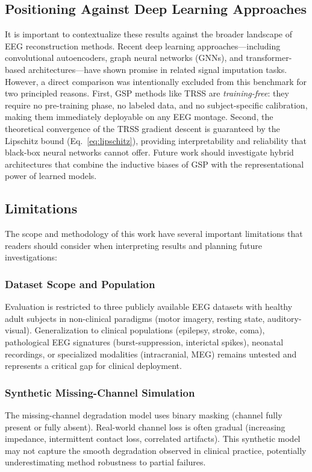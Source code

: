 \subsection{Positioning Against Deep Learning Approaches}
It is important to contextualize these results against the broader landscape of EEG reconstruction methods. Recent deep learning approaches---including convolutional autoencoders, graph neural networks (GNNs), and transformer-based architectures---have shown promise in related signal imputation tasks. However, a direct comparison was intentionally excluded from this benchmark for two principled reasons. First, GSP methods like TRSS are \emph{training-free}: they require no pre-training phase, no labeled data, and no subject-specific calibration, making them immediately deployable on any EEG montage. Second, the theoretical convergence of the TRSS gradient descent is guaranteed by the Lipschitz bound (Eq.~\ref{eq:lipschitz}), providing interpretability and reliability that black-box neural networks cannot offer. Future work should investigate hybrid architectures that combine the inductive biases of GSP with the representational power of learned models.

\subsection{Limitations}

The scope and methodology of this work have several important limitations that readers should consider when interpreting results and planning future investigations:

\subsubsection{Dataset Scope and Population}
Evaluation is restricted to three publicly available EEG datasets with healthy adult subjects in non-clinical paradigms (motor imagery, resting state, auditory-visual). Generalization to clinical populations (epilepsy, stroke, coma), pathological EEG signatures (burst-suppression, interictal spikes), neonatal recordings, or specialized modalities (intracranial, MEG) remains untested and represents a critical gap for clinical deployment.

\subsubsection{Synthetic Missing-Channel Simulation}
The missing-channel degradation model uses binary masking (channel fully present or fully absent). Real-world channel loss is often gradual (increasing impedance, intermittent contact loss, correlated artifacts). This synthetic model may not capture the smooth degradation observed in clinical practice, potentially underestimating method robustness to partial failures.

